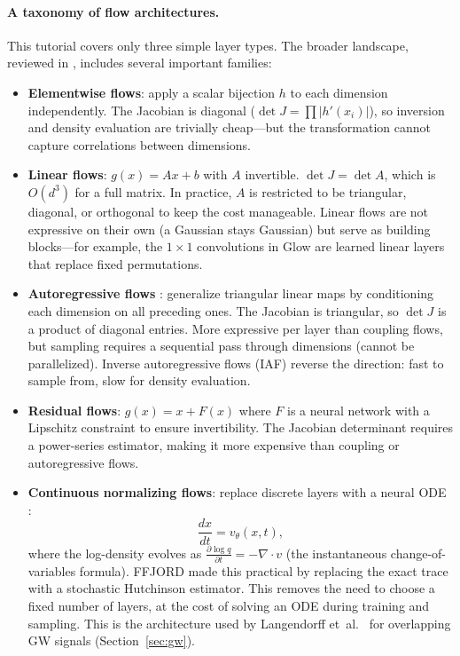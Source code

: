 \documentclass[11pt,letterpaper]{article}
\begin{document}
\paragraph{A taxonomy of flow architectures.}
This tutorial covers only three simple layer types.
The broader landscape, reviewed in \cite{kobyzev2021,papamakarios2021},
includes several important families:
\begin{itemize}
  \item \textbf{Elementwise flows}: apply a scalar bijection $h$ to
        each dimension independently.
        The Jacobian is diagonal ($\det J = \prod |h'(x_i)|$), so
        inversion and density evaluation are trivially cheap---but the
        transformation cannot capture correlations between dimensions.
  \item \textbf{Linear flows}: $g(x) = Ax + b$ with $A$ invertible.
        $\det J = \det A$, which is $O(d^3)$ for a full matrix.
        In practice, $A$ is restricted to be triangular, diagonal, or
        orthogonal to keep the cost manageable.
        Linear flows are not expressive on their own (a Gaussian stays
        Gaussian) but serve as building blocks---for example, the
        $1 \times 1$ convolutions in Glow \cite{kingma2018} are learned
        linear layers that replace fixed permutations.
  \item \textbf{Autoregressive flows}
        \cite{kingma2016,papamakarios2017}: generalize triangular linear
        maps by conditioning each dimension on all preceding ones.
        The Jacobian is triangular, so $\det J$ is a product of diagonal
        entries.
        More expressive per layer than coupling flows, but sampling
        requires a sequential pass through dimensions (cannot be
        parallelized).
        Inverse autoregressive flows (IAF) reverse the direction:
        fast to sample from, slow for density evaluation.
  \item \textbf{Residual flows}: $g(x) = x + F(x)$ where $F$ is a
        neural network with a Lipschitz constraint to ensure
        invertibility.
        The Jacobian determinant requires a power-series estimator,
        making it more expensive than coupling or autoregressive flows.
  \item \textbf{Continuous normalizing flows}: replace discrete layers
        with a neural ODE \cite{chen2018}:
        \begin{equation}
          \frac{dx}{dt} = v_\theta(x, t),
        \end{equation}
        where the log-density evolves as
        $\frac{\partial \log q}{\partial t} = -\nabla \cdot v$
        (the instantaneous change-of-variables formula).
        FFJORD \cite{grathwohl2018} made this practical by replacing the
        exact trace with a stochastic Hutchinson estimator.
        This removes the need to choose a fixed number of layers, at the
        cost of solving an ODE during training and sampling.
        This is the architecture used by Langendorff et~al.\
        \cite{langendorff2023} for overlapping GW signals
        (Section~\ref{sec:gw}).
\end{itemize}
\end{document}
